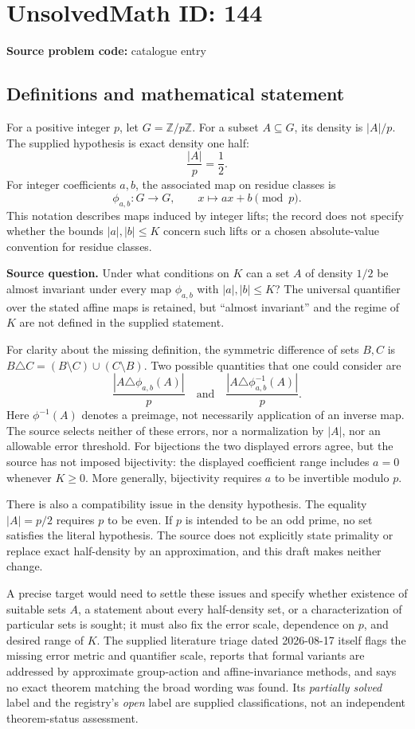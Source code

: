 \documentclass[11pt]{article}
\newcommand{\Z}{\mathbb{Z}}
\begin{document}
\section*{UnsolvedMath ID: 144}
\textbf{Source problem code:} catalogue entry
\subsection{Definitions and mathematical statement}
For a positive integer $p$, let $G=\Z/p\Z$. For a subset $A\subseteq G$, its density is $|A|/p$. The supplied hypothesis is exact density one half:
\[
 \frac{|A|}{p}=\frac12.
\]
For integer coefficients $a,b$, the associated map on residue classes is
\[
 \phi_{a,b}:G\longrightarrow G,\qquad x\longmapsto ax+b\pmod p.
\]
This notation describes maps induced by integer lifts; the record does not specify whether the bounds $|a|,|b|\leq K$ concern such lifts or a chosen absolute-value convention for residue classes.

\textbf{Source question.} Under what conditions on $K$ can a set $A$ of density $1/2$ be almost invariant under every map $\phi_{a,b}$ with $|a|,|b|\leq K$? The universal quantifier over the stated affine maps is retained, but ``almost invariant'' and the regime of $K$ are not defined in the supplied statement.

For clarity about the missing definition, the symmetric difference of sets $B,C$ is $B\triangle C=(B\setminus C)\cup(C\setminus B)$. Two possible quantities that one could consider are
\[
 \frac{|A\triangle\phi_{a,b}(A)|}{p}
 \quad\text{and}\quad
 \frac{|A\triangle\phi_{a,b}^{-1}(A)|}{p}.
\]
Here $\phi^{-1}(A)$ denotes a preimage, not necessarily application of an inverse map. The source selects neither of these errors, nor a normalization by $|A|$, nor an allowable error threshold. For bijections the two displayed errors agree, but the source has not imposed bijectivity: the displayed coefficient range includes $a=0$ whenever $K\geq0$. More generally, bijectivity requires $a$ to be invertible modulo $p$.

There is also a compatibility issue in the density hypothesis. The equality $|A|=p/2$ requires $p$ to be even. If $p$ is intended to be an odd prime, no set satisfies the literal hypothesis. The source does not explicitly state primality or replace exact half-density by an approximation, and this draft makes neither change.

A precise target would need to settle these issues and specify whether existence of suitable sets $A$, a statement about every half-density set, or a characterization of particular sets is sought; it must also fix the error scale, dependence on $p$, and desired range of $K$. The supplied literature triage dated 2026-08-17 itself flags the missing error metric and quantifier scale, reports that formal variants are addressed by approximate group-action and affine-invariance methods, and says no exact theorem matching the broad wording was found. Its \emph{partially solved} label and the registry's \emph{open} label are supplied classifications, not an independent theorem-status assessment.
\end{document}
